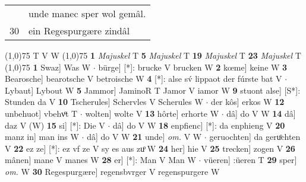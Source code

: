 \documentclass[8pt,a4paper,notitlepage]{article}
\begin{document}
\begin{table}[ht]
\begin{minipage}[t]{0.5\linewidth}
\begin{tabular}{rl}
 & unde manec sper wol gemâl.\\ 
30 & ein Regespurgære zindâl\\ 
\end{tabular}
\scriptsize
\line(1,0){75} \newline
T V W \newline
\line(1,0){75} \newline
\textbf{1} \textit{Majuskel} T  \textbf{5} \textit{Majuskel} T  \textbf{19} \textit{Majuskel} T  \textbf{23} \textit{Majuskel} T  \newline
\line(1,0){75} \newline
\textbf{1} Swaz] Was W  $\cdot$ bürge] [*]: brucke V brucken W \textbf{2} kœme] keine W \textbf{3} Bearosche] bearotsche V betroische W \textbf{4} [*]: alse sv́ lippaot der fúrste bat V  $\cdot$ Lybaut] Lybout W \textbf{5} Jammor] JaminoR T Jamor V iamor W \textbf{9} stuont alse] [S*]: Stunden da V \textbf{10} Tscherules] Schervles V Scherules W  $\cdot$ der kôs] erkos W \textbf{12} unbehuot] vbehvͦt T  $\cdot$ wolten] wolte V \textbf{13} hôrte] erhorte W  $\cdot$ dâ] do V W \textbf{14} dâ] daz V (W) \textbf{15} si] [*]: Die V  $\cdot$ dâ] do V W \textbf{18} enpfienc] [*]: da enphieng V \textbf{20} manz in] man ins W  $\cdot$ dâ] do V W \textbf{21} unde] \textit{om.} V W  $\cdot$ geruochten] da geruͦchten V \textbf{22} ez ze] [*]: ez vf ze V sy es aus zuͦ W \textbf{24} her] hie V \textbf{25} trecken] zogen V \textbf{26} mânen] mane V manes W \textbf{28} er] [*]: Man V Man W  $\cdot$ vüeren] :üeren T \textbf{29} sper] \textit{om.} W \textbf{30} Regespurgære] regensbvrger V regenspurgere W \newline
\end{minipage}
\end{table}
\end{document}
